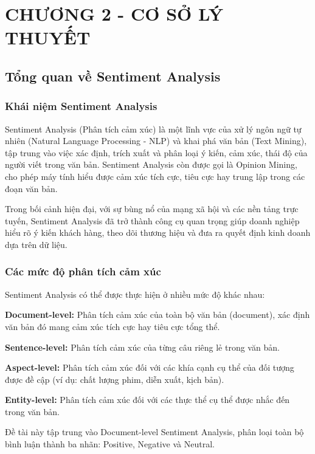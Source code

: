 
\section*{CHƯƠNG 2 - CƠ SỞ LÝ THUYẾT}
\setcounter{section}{2}
\setcounter{subsection}{0}
\setcounter{figure}{0}
\setcounter{table}{0}

\subsection{Tổng quan về Sentiment Analysis}

\subsubsection{Khái niệm Sentiment Analysis}
Sentiment Analysis (Phân tích cảm xúc) là một lĩnh vực của xử lý ngôn ngữ tự nhiên (Natural Language Processing - NLP) và khai phá văn bản (Text Mining), tập trung vào việc xác định, trích xuất và phân loại ý kiến, cảm xúc, thái độ của người viết trong văn bản. Sentiment Analysis còn được gọi là Opinion Mining, cho phép máy tính hiểu được cảm xúc tích cực, tiêu cực hay trung lập trong các đoạn văn bản.

Trong bối cảnh hiện đại, với sự bùng nổ của mạng xã hội và các nền tảng trực tuyến, Sentiment Analysis đã trở thành công cụ quan trọng giúp doanh nghiệp hiểu rõ ý kiến khách hàng, theo dõi thương hiệu và đưa ra quyết định kinh doanh dựa trên dữ liệu.

\subsubsection{Các mức độ phân tích cảm xúc}
Sentiment Analysis có thể được thực hiện ở nhiều mức độ khác nhau:

\textbf{Document-level:} Phân tích cảm xúc của toàn bộ văn bản (document), xác định văn bản đó mang cảm xúc tích cực hay tiêu cực tổng thể.

\textbf{Sentence-level:} Phân tích cảm xúc của từng câu riêng lẻ trong văn bản.

\textbf{Aspect-level:} Phân tích cảm xúc đối với các khía cạnh cụ thể của đối tượng được đề cập (ví dụ: chất lượng phim, diễn xuất, kịch bản).

\textbf{Entity-level:} Phân tích cảm xúc đối với các thực thể cụ thể được nhắc đến trong văn bản.

Đề tài này tập trung vào Document-level Sentiment Analysis, phân loại toàn bộ bình luận thành ba nhãn: Positive, Negative và Neutral.

